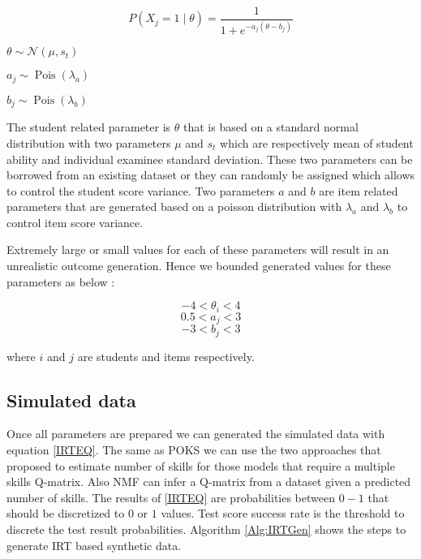 
\newcommand\pN{\mathcal{N}}

\begin{equation}
P(X_j\!=\!1\;|\;\theta) = \frac{1}{1+e^{-a_j(\theta-b_j)}}
\label{IRTEQ}
\end{equation}

\begin{center}
$\theta \sim \pN(\mu, s_t)$

$a_j \sim \operatorname{Pois} \left({\lambda_a}\right)$

$b_j \sim \operatorname{Pois} \left({\lambda_b}\right)$
\end{center}


The student related parameter is $\theta$ that is based on a standard normal distribution with two parameters $\mu$ and $s_t$ which are respectively mean of student ability and individual examinee standard deviation. These two parameters can be borrowed from an existing dataset or they can randomly be assigned which allows to control the student score variance. Two parameters $a$ and $b$ are item related parameters that are generated based on a poisson distribution with $\lambda_a$ and $\lambda_b$ to control item score variance.

Extremely large or small values for each of these parameters will result in an unrealistic outcome generation. Hence we bounded generated values for these parameters as below :

\begin{center}
\[-4 < \theta_i < 4\]
\[0.5 < a_j < 3\]
\[-3 < b_j < 3\]
\end{center}
where $i$ and $j$ are students and items respectively.

\subsection{Simulated data}

Once all parameters are prepared we can generated the simulated data with equation \ref{IRTEQ}. The same as POKS we can use the two approaches that \citet{Beheshti2012Numbers} proposed to estimate number of skills for those models that require a multiple skills Q-matrix. Also NMF can infer a Q-matrix from a dataset given a predicted number of skills. The results of \ref{IRTEQ} are probabilities between $0-1$ that should be discretized to $0$ or $1$ values. Test score success rate is the threshold to discrete the test result probabilities. Algorithm \ref{Alg:IRTGen} shows the steps to generate IRT based synthetic data.


